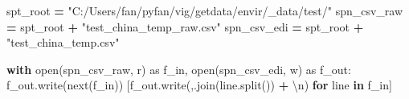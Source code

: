 \documentclass[
]{book}
\newenvironment{Shaded}{\begin{snugshade}}{\end{snugshade}}
\newcommand{\BuiltInTok}[1]{#1}
\newcommand{\CharTok}[1]{\textcolor[rgb]{0.31,0.60,0.02}{#1}}
\newcommand{\ControlFlowTok}[1]{\textcolor[rgb]{0.13,0.29,0.53}{\textbf{#1}}}
\newcommand{\ImportTok}[1]{#1}
\newcommand{\KeywordTok}[1]{\textcolor[rgb]{0.13,0.29,0.53}{\textbf{#1}}}
\newcommand{\NormalTok}[1]{#1}
\newcommand{\OperatorTok}[1]{\textcolor[rgb]{0.81,0.36,0.00}{\textbf{#1}}}
\newcommand{\StringTok}[1]{\textcolor[rgb]{0.31,0.60,0.02}{#1}}
\begin{document}
\begin{Shaded}
\begin{Highlighting}[]
\NormalTok{spt\_root }\OperatorTok{=} \StringTok{"C:/Users/fan/pyfan/vig/getdata/envir/\_data/test/"}
\NormalTok{spn\_csv\_raw }\OperatorTok{=}\NormalTok{ spt\_root }\OperatorTok{+} \StringTok{"test\_china\_temp\_raw.csv"}
\NormalTok{spn\_csv\_edi }\OperatorTok{=}\NormalTok{ spt\_root }\OperatorTok{+} \StringTok{"test\_china\_temp.csv"}

\ControlFlowTok{with} \BuiltInTok{open}\NormalTok{(spn\_csv\_raw, }\StringTok{\textquotesingle{}r\textquotesingle{}}\NormalTok{) }\ImportTok{as}\NormalTok{ f\_in, }\BuiltInTok{open}\NormalTok{(spn\_csv\_edi, }\StringTok{\textquotesingle{}w\textquotesingle{}}\NormalTok{) }\ImportTok{as}\NormalTok{ f\_out:}
\NormalTok{    f\_out.write(}\BuiltInTok{next}\NormalTok{(f\_in))}
\NormalTok{    [f\_out.write(}\StringTok{\textquotesingle{},\textquotesingle{}}\NormalTok{.join(line.split()) }\OperatorTok{+} \StringTok{\textquotesingle{}}\CharTok{\textbackslash{}n}\StringTok{\textquotesingle{}}\NormalTok{) }\ControlFlowTok{for}\NormalTok{ line }\KeywordTok{in}\NormalTok{ f\_in]}
\end{Highlighting}
\end{Shaded}
\end{document}

